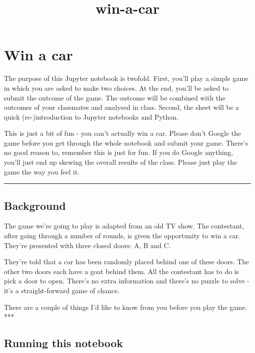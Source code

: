 \documentclass[11pt]{article}
\title{win-a-car}
\begin{document}
    
    
    \maketitle
    
    

    
    \hypertarget{win-a-car}{%
\section{Win a car}\label{win-a-car}}

The purpose of this Jupyter notebook is twofold. First, you'll play a
simple game in which you are asked to make two choices. At the end,
you'll be asked to submit the outcome of the game. The outcome will be
combined with the outcomes of your classmates and analysed in class.
Second, the sheet will be a quick (re-)introduction to Jupyter notebooks
and Python.

This is just a bit of fun - you can't actually win a car. Please don't
Google the game before you get through the whole notebook and submit
your game. There's no good reason to, remember this is just for fun. If
you do Google anything, you'll just end up skewing the overall results
of the class. Please just play the game the way you feel it.

\begin{center}\rule{0.5\linewidth}{\linethickness}\end{center}

    \hypertarget{background}{%
\subsection{Background}\label{background}}

The game we're going to play is adapted from an old TV show. The
contestant, after going through a number of rounds, is given the
opportunity to win a car. They're presented with three closed doors: A,
B and C.

They're told that a car has been randomly placed behind one of these
doors. The other two doors each have a goat behind them. All the
contestant has to do is pick a door to open. There's no extra
information and there's no puzzle to solve - it's a straight-forward
game of chance.

There are a couple of things I'd like to know from you before you play
the game. ***

    \hypertarget{running-this-notebook}{%
\subsection{Running this notebook}\label{running-this-notebook}}
\end{document}
